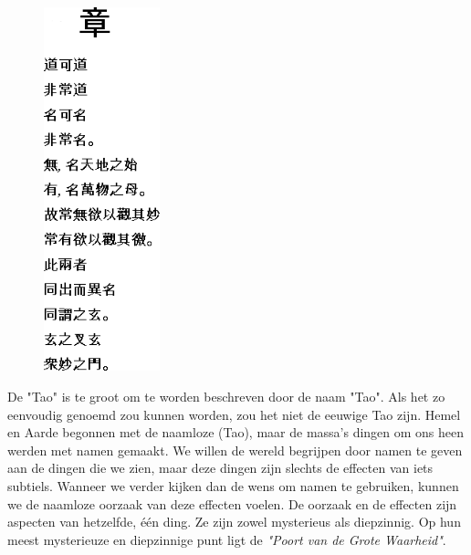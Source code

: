 \documentclass[11pt]{article}
\begin{document}
\begin{figure}
    \centering
    \vspace{-45pt}
    \includegraphics[width=0.30\textwidth]{tao.png}
\end{figure}

\noindent
\vspace{-10pt}
\begin{flushright}
De "Tao" is te groot om te worden beschreven door de naam "Tao". Als het zo eenvoudig genoemd zou kunnen worden, zou het niet de eeuwige Tao zijn.\vspace{10pt}\linebreak
Hemel en Aarde begonnen met de naamloze (Tao), maar de massa's 
dingen om ons heen werden met namen gemaakt.\vspace{10pt}\linebreak
We willen de wereld begrijpen door namen te geven aan de dingen die we zien, maar deze dingen zijn slechts de effecten van iets subtiels.\vspace{10pt}\linebreak
Wanneer we verder kijken dan de wens om namen te gebruiken, kunnen we de naamloze oorzaak van deze effecten voelen. \vspace{10pt}\linebreak
De oorzaak en de effecten zijn aspecten van hetzelfde, \'e\'en ding. Ze zijn zowel mysterieus als diepzinnig.\vspace{20pt}\linebreak
Op hun meest mysterieuze en diepzinnige punt ligt de \textit{"Poort van de Grote Waarheid"}.
\end{flushright}
\end{document}
